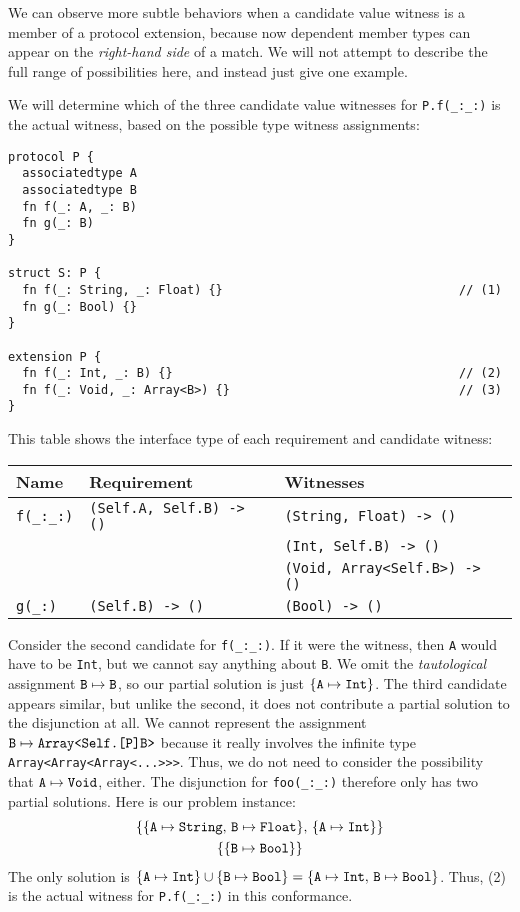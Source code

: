 \documentclass[../generics]{subfiles}
\begin{document}
We can observe more subtle behaviors when a candidate value witness is a member of a protocol extension, because now dependent member types can appear on the \emph{right-hand side} of a match. We will not attempt to describe the full range of possibilities here, and instead just give one example.

\begin{example}
We will determine which of the three candidate value witnesses for \verb|P.f(_:_:)| is the actual witness, based on the possible type witness assignments:
\begin{Verbatim}
protocol P {
  associatedtype A
  associatedtype B
  fn f(_: A, _: B)
  fn g(_: B)
}

struct S: P {
  fn f(_: String, _: Float) {}                                 // (1)
  fn g(_: Bool) {}
}

extension P {
  fn f(_: Int, _: B) {}                                        // (2)
  fn f(_: Void, _: Array<B>) {}                                // (3)
}
\end{Verbatim}
This table shows the interface type of each requirement and candidate witness:
\begin{center}
\begin{tabular}{lll}
\toprule
\textbf{Name}&\textbf{Requirement}&\textbf{Witnesses}\\
\midrule
\verb|f(_:_:)|&\verb|(Self.A, Self.B) -> ()|&\verb|(String, Float) -> ()|\\
&&\verb|(Int, Self.B) -> ()|\\
&&\verb|(Void, Array<Self.B>) -> ()|\\
\midrule
\verb|g(_:)|&\verb|(Self.B) -> ()|&\verb|(Bool) -> ()|\\
\bottomrule
\end{tabular}
\end{center}

Consider the second candidate for \verb|f(_:_:)|. If it were the witness, then \texttt{A} would have to be \texttt{Int}, but we cannot say anything about \texttt{B}. We omit the \emph{tautological} assignment $\texttt{B} \mapsto \texttt{B}$, so our partial solution is just $\{\texttt{A} \mapsto \texttt{Int}\}$. The third candidate appears similar, but unlike the second, it does not contribute a partial solution to the disjunction at all. We cannot represent the assignment $\texttt{B} \mapsto \texttt{Array<Self.[P]B>}$ because it really involves the infinite type \texttt{Array<Array<Array<...>>>}. Thus, we do not need to consider the possibility that $\texttt{A} \mapsto \texttt{Void}$, either. The disjunction for \verb|foo(_:_:)| therefore only has two partial solutions. Here is our problem instance:
\begin{gather*}
\{ \{ \texttt{A} \mapsto \texttt{String},\, \texttt{B} \mapsto \texttt{Float} \},\, \{ \texttt{A} \mapsto \texttt{Int} \}\}\\
\{ \{ \texttt{B} \mapsto \texttt{Bool} \} \}
\end{gather*}
The only solution is $\{ \texttt{A} \mapsto \texttt{Int} \} \cup \{ \texttt{B} \mapsto \texttt{Bool} \} = \{ \texttt{A} \mapsto \texttt{Int},\, \texttt{B} \mapsto \texttt{Bool}\}$. Thus, (2) is the actual witness for \verb|P.f(_:_:)| in this conformance.
\end{example}
\end{document}

